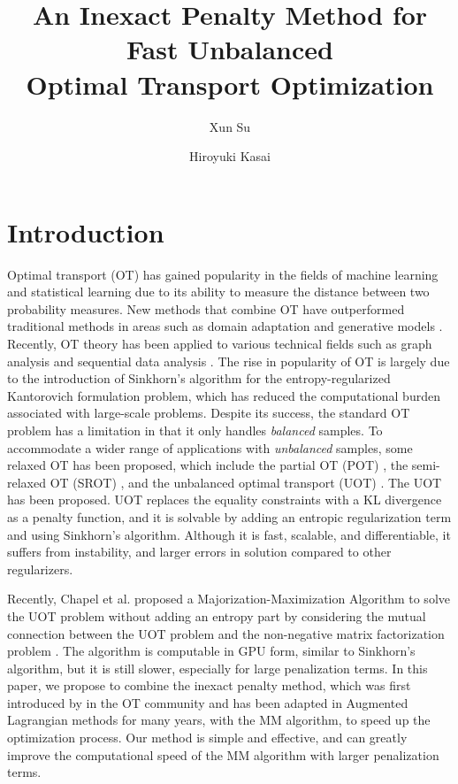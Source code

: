 \documentclass[a4paper,twocolumn]{article}
\title{An Inexact Penalty Method for Fast Unbalanced \protect\\ Optimal Transport Optimization}
\author{%
Xun Su\first
\and
Hiroyuki Kasai\second
}
\begin{document}
\maketitle

\section{Introduction}
\label{sec:int}

Optimal transport (OT) has gained popularity in the fields of machine learning and statistical learning due to its ability to measure the distance between two probability measures. New methods that combine OT have outperformed traditional methods in areas such as domain adaptation \cite{Courty_PAMI_2017} and generative models \cite{arjovsky2017wasserstein}. Recently, OT theory has been applied to various technical fields such as graph analysis \cite{Huang_SigPro_2020,Huang_ICASSP_2021,Fang_AAAI_2023} and sequential data analysis \cite{Horie_EUSIPCO_2022}. The rise in popularity of OT is largely due to the introduction of Sinkhorn's algorithm \cite{Cuturi_NIPS_2013} for the entropy-regularized Kantorovich formulation problem, which has reduced the computational burden associated with large-scale problems. Despite its success, the standard OT problem has a limitation in that it only handles {\it balanced} samples. To accommodate a wider range of applications with {\it unbalanced} samples, some relaxed OT has been proposed, which include the partial OT (POT) \cite{ferradans2013regularized}, the semi-relaxed OT (SROT) \cite{fukunaga_icassp2022,fukunaga_srsinkhorn}, and the unbalanced optimal transport (UOT) \cite{Caffarelli_AM_2010,chizat2017scaling}. The UOT has been proposed. UOT replaces the equality constraints with a KL divergence as a penalty function, and it is solvable by adding an entropic regularization term and using Sinkhorn's algorithm. Although it is fast, scalable, and differentiable, it suffers from instability, and larger errors in solution compared to other regularizers.

Recently, Chapel et al. proposed a Majorization-Maximization Algorithm to solve the UOT problem without adding an entropy part by considering the mutual connection between the UOT problem and the non-negative matrix factorization problem \cite{Chapel_NeurIPS_2021}. The algorithm is computable in GPU form, similar to Sinkhorn's algorithm, but it is still slower, especially for large penalization terms. In this paper, we propose to combine the inexact penalty method, which was first introduced by \cite{pmlr-v115-xie20b} in the OT community and has been adapted in Augmented Lagrangian methods for many years, with the MM algorithm, to speed up the optimization process. Our method is simple and effective, and can greatly improve the computational speed of the MM algorithm with larger penalization terms.
\end{document}
